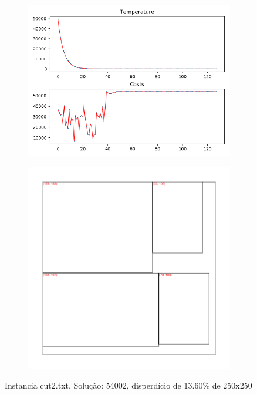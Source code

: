 \begin{figure}
\centering
\begin{subfigure}{.5\textwidth}
  \centering
  \includegraphics[width=1\linewidth]{results/cut2/3/plot}
  \label{fig:sub1}
\end{subfigure}%
\begin{subfigure}{.5\textwidth}
  \centering
  \includegraphics[width=1\linewidth]{results/cut2/3/cut}
  \label{fig:sub2}
\end{subfigure}
\caption{Instancia cut2.txt, Solução: 54002, disperdício de 13.60\% de 250x250}
\label{fig:test}
\end{figure}


